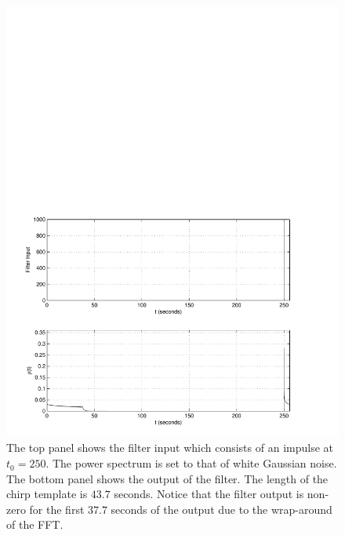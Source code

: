 \begin{figure}[htb]
\label{f:impuse_wraparound}
\begin{center}
\includegraphics[width=\linewidth]{figures/findchirp/impulse_wraparound}
\end{center}
\caption{%
The top panel shows the filter input which consists of an impulse at $t_0 = 250$.
The power spectrum is set to that of white Gaussian noise. The bottom panel
shows the output of the filter. The length of the chirp template is $43.7$
seconds. Notice that the filter output is non-zero for the first $37.7$
seconds of the output due to the wrap-around of the FFT.
}
\end{figure}

